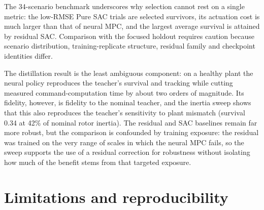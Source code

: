 \documentclass[preprint,12pt,authoryear=false]{elsarticle}
\theoremstyle{remark}\newtheorem{remark}{Remark}
\theoremstyle{plain}\newtheorem{proposition}{Proposition}\newtheorem{lemma}{Lemma}
\theoremstyle{definition}\newtheorem{assumption}{Assumption}
\begin{document}
The 34-scenario benchmark underscores why selection cannot rest on a single metric: the low-RMSE Pure SAC trials are selected survivors, its actuation cost is much larger than that of neural MPC, and the largest average survival is attained by residual SAC. Comparison with the focused holdout requires caution because scenario distribution, training-replicate structure, residual family and checkpoint identities differ.

The distillation result is the least ambiguous component: on a healthy plant the neural policy reproduces the teacher's survival and tracking while cutting measured command-computation time by about two orders of magnitude. Its fidelity, however, is fidelity to the nominal teacher, and the inertia sweep shows that this also reproduces the teacher's sensitivity to plant mismatch (survival 0.34 at 42\% of nominal rotor inertia). The residual and SAC baselines remain far more robust, but the comparison is confounded by training exposure: the residual was trained on the very range of scales in which the neural MPC fails, so the sweep supports the use of a residual correction for robustness without isolating how much of the benefit stems from that targeted exposure.

\section{Limitations and reproducibility}\label{sec:limits}
\end{document}
